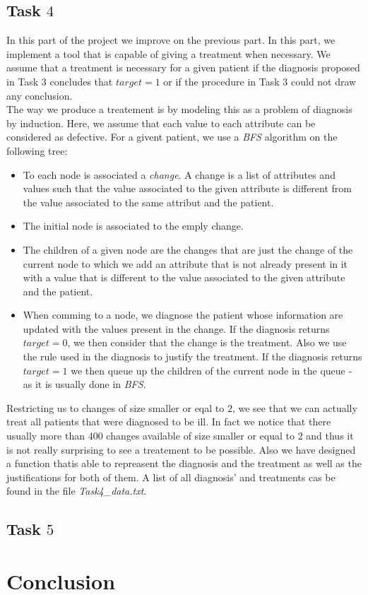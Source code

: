 \documentclass[french]{article}
\begin{document}
\subsection{Task $4$}
	In this part of the project we improve on the previous part. In this part, we implement a tool that is capable of giving a treatment when necessary. We assume that a treatment is necessary for a given patient if the diagnosis proposed in Task $3$ concludes that $target=1$ or if the procedure in Task $3$ could not draw any conclusion.\\
	The way we produce a treatement is by modeling this as a problem of diagnosis by induction. Here, we assume that each value to each attribute can be considered as defective. For a givent patient, we use a \emph{BFS} algorithm on the following tree:
	\begin{itemize}
		\item To each node is associated a \emph{change}. A change is a list of attributes and values such that the value associated to the given attribute is different from the value associated to the same attribut and the patient.
		\item The initial node is associated to the emply change.
		\item The children of a given node are the changes that are just the change of the current node to which we add an attribute that is not already present in it with a value that is different to the value associated to the given attribute and the patient.
		\item When comming to a node, we diagnose the patient whose information are updated with the values present in the change. If the diagnosis returns $target=0$, we then consider that the change is the treatment. Also we use the rule used in the diagnosis to justify the treatment. If the diagnosis returns $target=1$ we then queue up the children of the current node in the queue - as it is usually done in \emph{BFS}.
	\end{itemize}
Restricting us to changes of size smaller or eqal to $2$, we see that we can actually treat all patients that were diagnosed to be ill. In fact we notice that there usually more than $400$ changes available of size smaller or equal to $2$ and thus it is not really surprising to see a treatement to be possible. Also we have designed a function thatis able to repreasent the diagnosis and the treatment as well as the justifications for both of them. A list of all diagnosis' and treatments cas be found in the file \emph{Task4\_data.txt}.

\subsection{Task $5$}

\section{Conclusion}
\end{document}
